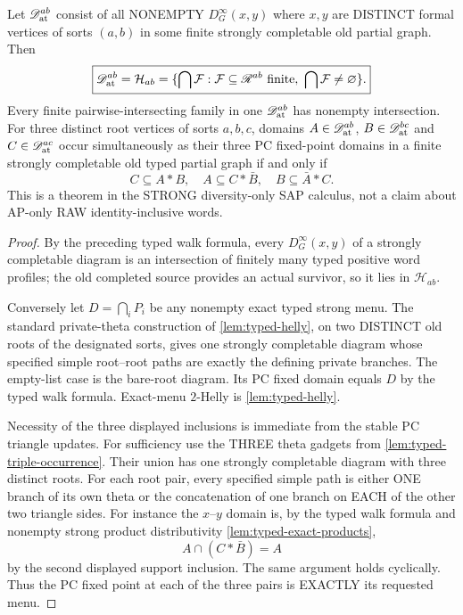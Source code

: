 \begin{lemma}
\label{lem:typed-PC-fixedpoint-exact}
Let $\mathscr D_{\mathrm{at}}^{ab}$ consist of all NONEMPTY
$D^\infty_G(x,y)$ where $x,y$ are DISTINCT
formal vertices of sorts $(a,b)$ in some
finite strongly completable old partial graph.
Then
\[
 \boxed{\mathscr D_{\mathrm{at}}^{ab}=\mathcal H_{ab}
 =\{\bigcap\mathcal F:
     \mathcal F\subseteq\mathscr R^{ab}\text{ finite},
     \ \bigcap\mathcal F\ne\varnothing\}.}
\]
Every finite pairwise-intersecting family in
one $\mathscr D_{\mathrm{at}}^{ab}$ has nonempty intersection.
For three distinct root vertices of sorts
$a,b,c$, domains $A\in\mathscr D_{\mathrm{at}}^{ab}$,
$B\in\mathscr D_{\mathrm{at}}^{bc}$ and $C\in\mathscr D_{\mathrm{at}}^{ac}$
occur simultaneously as their three PC
fixed-point domains in a finite strongly
completable old typed partial graph if and
only if
\[
 C\subseteq A*B,\quad
 A\subseteq C*\bar B,\quad
 B\subseteq\bar A*C.
\]
This is a theorem in the STRONG diversity-only
SAP calculus, not a claim about AP-only RAW
identity-inclusive words.
\end{lemma}
\begin{proof}
By the preceding typed walk formula, every
$D^\infty_G(x,y)$ of a strongly completable
diagram is an intersection of finitely many
typed positive word profiles; the old completed
source provides an actual survivor, so it lies
in $\mathcal H_{ab}$.

Conversely let $D=\bigcap_iP_i$ be any
nonempty exact typed strong menu. The standard
private-theta construction of
\cref{lem:typed-helly}, on two DISTINCT
old roots of the designated sorts, gives
one strongly completable diagram whose
specified simple root--root paths are exactly
the defining private branches. The empty-list
case is the bare-root diagram. Its PC fixed
domain equals $D$ by the typed walk formula.
Exact-menu $2$-Helly is
\cref{lem:typed-helly}.

Necessity of the three displayed inclusions
is immediate from the stable PC triangle
updates. For sufficiency use the THREE theta
gadgets from \cref{lem:typed-triple-occurrence}.
Their union has one strongly completable
diagram with three distinct roots. For each
root pair, every specified simple path is
either ONE branch of its own theta or the
concatenation of one branch on EACH of the
other two triangle sides. For instance the
$x$--$y$ domain is, by the typed walk formula
and nonempty strong product distributivity
\cref{lem:typed-exact-products},
\[
 A\cap(C*\bar B)=A
\]
by the second displayed support inclusion.
The same argument holds cyclically.
Thus the PC fixed point at each of the
three pairs is EXACTLY its requested menu.
\end{proof}
